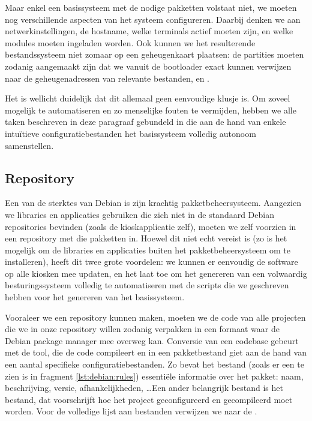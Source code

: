 Maar enkel een basissysteem met de nodige pakketten volstaat niet, we moeten nog verschillende aspecten van het systeem configureren. Daarbij denken we aan netwerkinstellingen, de hostname, welke terminals actief moeten zijn, en welke modules moeten ingeladen worden. Ook kunnen we het resulterende bestandssysteem niet zomaar op een geheugenkaart plaatsen: de partities moeten zodanig aangemaakt zijn dat we vanuit de bootloader exact kunnen verwijzen naar de geheugenadressen van relevante bestanden,  en .

Het is wellicht duidelijk dat dit allemaal geen eenvoudige klusje is. Om zoveel mogelijk te automatiseren en zo menselijke fouten te vermijden, hebben we alle taken beschreven in deze paragraaf gebundeld in  die aan de hand van enkele intuïtieve configuratiebestanden het basissysteem volledig autonoom samenstellen.

\subsection{Repository}
\label{kiosk:deployment:besturingssysteem:repository}

Een van de sterktes van Debian is zijn krachtig pakketbeheersysteem. Aangezien we libraries en applicaties gebruiken die zich niet in de standaard Debian repositories bevinden (zoals de kioskapplicatie zelf), moeten we zelf voorzien in een repository met die pakketten in. Hoewel dit niet echt vereist is (zo is het mogelijk om de libraries en applicaties buiten het pakketbeheersysteem om te installeren), heeft dit twee grote voordelen: we kunnen er eenvoudig de software op alle kiosken mee updaten, en het laat toe om het genereren van een volwaardig besturingssysteem volledig te automatiseren met de scripts die we geschreven hebben voor het genereren van het basissysteem.

Vooraleer we een repository kunnen maken, moeten we de code van alle projecten die we in onze repository willen zodanig verpakken in een formaat waar de Debian package manager mee overweg kan. Conversie van een codebase gebeurt met de  tool, die de code compileert en in een pakketbestand giet aan de hand van een aantal specifieke configuratiebestanden. Zo bevat het  bestand (zoals er een te zien is in fragment \ref{lst:debian:rules}) essentiële informatie over het pakket: naam, beschrijving, versie, afhankelijkheden, \ldots Een ander belangrijk bestand is het  bestand, dat voorschrijft hoe het project geconfigureerd en gecompileerd moet worden. Voor de volledige lijst aan bestanden verwijzen we naar de .

